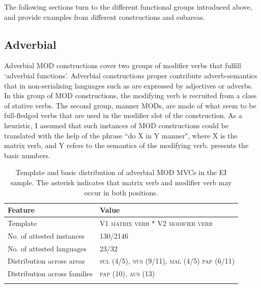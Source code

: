 The following sections turn to the different functional groups introduced above, and provide examples from different constructions and subareas.

\subsection{Adverbial}\label{sec:adverbial}

Adverbial MOD constructions cover two groups of modifier verbs that fulfill `adverbial functions'. Adverbial constructions proper contribute adverb-semantics that in non-serialising languages such as  are expressed by adjectives or adverbs. In this group of MOD constructions, the modifying verb is recruited from a class of stative verbs. The second group, manner MODs, are made of what seem to be full-fledged verbs that are used in the modifier slot of the construction. As a heuristic, I assumed that such instances of MOD constructions could be translated with the help of the phrase ``do X in Y manner", where X is the matrix verb, and Y refers to the semantics of the modifying verb.  presents the basic numbers. 

\begin{table}
\begin{tabular}{ll}
\lsptoprule
Feature&Value\tabularnewline
\midrule
Template&V1 \textsc{matrix verb} * V2 \textsc{modifier verb}\tabularnewline
No. of attested instances& 130/2146 \tabularnewline
No. of attested languages& 23/32 \tabularnewline
Distribution across areas& \textsc{sul} (4/5), \textsc{nus} (9/11), \textsc{mal} (4/5) \textsc{pap} (6/11) \tabularnewline
Distribution across families& \textsc{pap} (10), \textsc{aus} (13) \tabularnewline
\lspbottomrule
\end{tabular}
\caption[Template and basic distribution of adverbial MOD MVCs]{Template and basic distribution of adverbial MOD MVCs in the EI sample. The asterisk indicates that matrix verb and modifier verb may occur in both positions.}
\label{table:adverbial}
\end{table}

